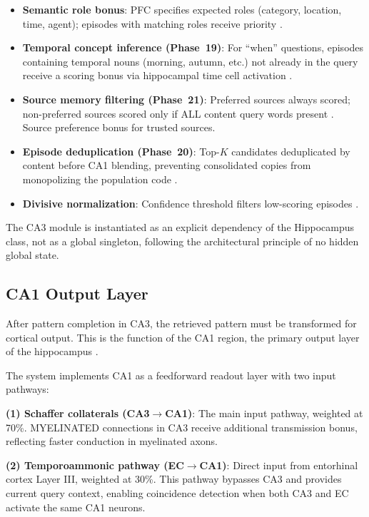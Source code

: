 \documentclass[11pt]{article}
\begin{document}
\begin{itemize}
      metacognitive uncertainty, and the source filter is relaxed for self-tagged traces so
      autobiographical experience is not discarded by generic source priors.
\item \textbf{Semantic role bonus}: PFC specifies expected roles (category, location, time,
      agent); episodes with matching roles receive priority \citep{binder2009semantic}.
\item \textbf{Temporal concept inference (Phase~19)}: For ``when'' questions, episodes
      containing temporal nouns (morning, autumn, etc.) not already in the query receive
      a scoring bonus via hippocampal time cell activation \citep{eichenbaum2014time}.
\item \textbf{Source memory filtering (Phase~21)}: Preferred sources always scored;
      non-preferred sources scored only if ALL content query words present
      \citep{johnson1993source}. Source preference bonus for trusted sources.
\item \textbf{Episode deduplication (Phase~20)}: Top-$K$ candidates deduplicated by
      content before CA1 blending, preventing consolidated copies from monopolizing
      the population code \citep{born2012system}.
\item \textbf{Divisive normalization}: Confidence threshold filters low-scoring episodes
      \citep{carandini2012normalization}.
\end{itemize}

The CA3 module is instantiated as an explicit dependency of the Hippocampus class,
not as a global singleton, following the architectural principle of no hidden global state.

\subsection{CA1 Output Layer}

After pattern completion in CA3, the retrieved pattern must be transformed for cortical output.
This is the function of the CA1 region, the primary output layer of the hippocampus
\citep{amaral1989three,naber2001reciprocal}.

The system implements CA1 as a feedforward readout layer with two input pathways:

\textbf{(1) Schaffer collaterals (CA3$\rightarrow$CA1)}: The main input pathway, weighted at 70\%.
MYELINATED connections in CA3 receive additional transmission bonus, reflecting faster conduction
in myelinated axons.

\textbf{(2) Temporoammonic pathway (EC$\rightarrow$CA1)}: Direct input from entorhinal cortex Layer III,
weighted at 30\%. This pathway bypasses CA3 and provides current query context, enabling
coincidence detection when both CA3 and EC activate the same CA1 neurons.
\end{document}
